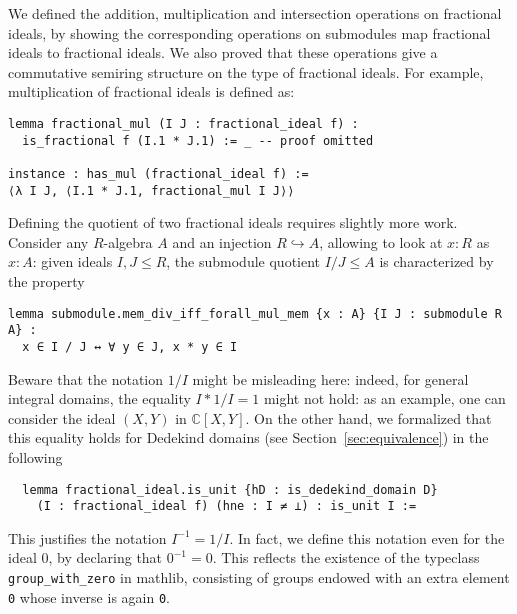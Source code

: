 \documentclass[a4paper,USenglish,cleveref, autoref, thm-restate]{lipics-v2021}
\newcommand{\C}{\mathbb{C}}
\newcommand{\lean}[1]{\texttt{#1}\xspace} %
\newcommand{\mathlib}{\textsf{mathlib}\xspace}
\begin{document}
We defined the addition, multiplication and intersection operations on fractional ideals,
by showing the corresponding operations on submodules map fractional ideals to fractional ideals.
We also proved that these operations give a commutative semiring structure on the type of fractional ideals.
For example, multiplication of fractional ideals is defined as:
\begin{lstlisting}
lemma fractional_mul (I J : fractional_ideal f) :
  is_fractional f (I.1 * J.1) := _ -- proof omitted

instance : has_mul (fractional_ideal f) :=
⟨λ I J, ⟨I.1 * J.1, fractional_mul I J⟩⟩
\end{lstlisting}

Defining the quotient of two fractional ideals requires slightly more work. Consider any $R$-algebra $A$ and an injection $R\hookrightarrow A$, allowing to look at $x:R$ as $x:A$: given ideals $I,J\le R$, the submodule quotient $I / J\le A$ %
is characterized by the property
\begin{lstlisting}
lemma submodule.mem_div_iff_forall_mul_mem {x : A} {I J : submodule R A} :
  x ∈ I / J ↔ ∀ y ∈ J, x * y ∈ I
\end{lstlisting}
Beware that the notation $1/I$ might be misleading here: indeed, for general integral domains, the equality $I\ast 1/I=1$ might not hold: as an example, one can consider the ideal $(X,Y)$ in $\C[X,Y]$. 
On the other hand, we formalized that this equality holds for Dedekind domains (see Section~\ref{sec:equivalence}) in the following
\begin{lstlisting}
  lemma fractional_ideal.is_unit {hD : is_dedekind_domain D}
    (I : fractional_ideal f) (hne : I ≠ ⊥) : is_unit I :=
  \end{lstlisting}
This justifies the notation $I^{-1}=1/I$. In fact, we define this notation even for the ideal $0$, by declaring that $0^{-1}=0$. This reflects the existence of the typeclass \lean{group\_with\_zero} in \mathlib, consisting of groups endowed with an extra element \lean{0} whose inverse is again \lean{0}. %
\end{document}

